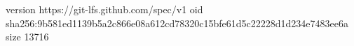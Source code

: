 version https://git-lfs.github.com/spec/v1
oid sha256:9b581ed1139b5a2c866e08a612cd78320c15bfe61d5c22228d1d234e7483ee6a
size 13716

